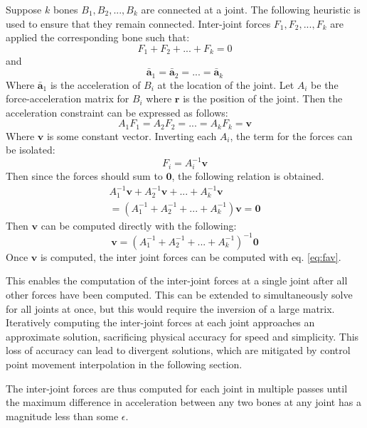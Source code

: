 \documentclass[10pt,twocolumn,letterpaper]{article}
\begin{document}
Suppose $k$ bones $B_1, B_2, ..., B_k$ are connected at a joint. The following heuristic is used to ensure that they remain connected. Inter-joint forces $F_1, F_2, ..., F_k$ are applied the corresponding bone such that:
\begin{equation}
F_1 + F_2 + ... + F_k = 0
\end{equation}
and
\begin{equation}
\bar{\bm{a}}_1 = \bar{\bm{a}}_2 = ... = \bar{\bm{a}}_k
\end{equation}
Where $\bar{\bm{a}}_1$ is the acceleration of $B_i$ at the location of the joint. Let $A_i$ be the force-acceleration matrix for $B_i$ where $\bm{r}$ is the position of the joint. Then the acceleration constraint can be expressed as follows:
\begin{equation}
A_1 F_1 = A_2 F_2 = ... = A_k F_k = \bm{v}
\end{equation}
Where $\bm{v}$ is some constant vector. Inverting each $A_i$, the term for the forces can be isolated:
\begin{equation}
F_i = A_i^{-1} \bm{v} 
\label{eq:fav}
\end{equation}
Then since the forces should sum to $\bm{0}$, the following relation is obtained.
\begin{multline}
A_1^{-1} \bm{v} + A_2^{-1} \bm{v} + ... + A_k^{-1} \bm{v} \\
= (A_1^{-1} + A_2^{-1} + ... + A_k^{-1}) \bm{v} = \bm{0} 
\end{multline}
Then $\bm{v}$ can be computed directly with the following:
\begin{equation}
\bm{v} =  (A_1^{-1} + A_2^{-1} + ... + A_k^{-1})^{-1} \bm{0}
\end{equation}
Once $\bm{v}$ is computed, the inter joint forces can be computed with eq. \ref{eq:fav}. 

This enables the computation of the inter-joint forces at a single joint after all other forces have been computed. This can be extended to simultaneously solve for all joints at once, but this would require the inversion of a large matrix. Iteratively computing the inter-joint forces at each joint approaches an approximate solution, sacrificing physical accuracy for speed and simplicity. This loss of accuracy can lead to divergent solutions, which are mitigated by control point movement interpolation in the following section.

The inter-joint forces are thus computed for each joint in multiple passes until the maximum difference in acceleration between any two bones at any joint has a magnitude less than some $\epsilon$.
\end{document}
